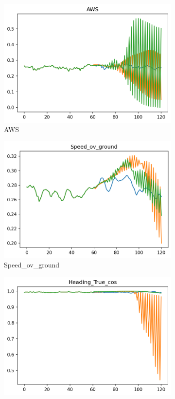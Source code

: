 \documentclass[12pt,twoside]{report}
\begin{document}
\begin{figure}[h]
\begin{subfigure}[b]{0.32\textwidth}
         \includegraphics[width=\textwidth]{figures/prediction-plots-joint/AWS.png}
         \caption{AWS}
     \end{subfigure}
     \begin{subfigure}[b]{0.32\textwidth}
         \centering
         \includegraphics[width=\textwidth]{figures/prediction-plots-joint/Speed_ov_ground.png}
         \caption{Speed\_ov\_ground}
     \end{subfigure}
     \begin{subfigure}[b]{0.32\textwidth}
         \centering
         \includegraphics[width=\textwidth]{figures/prediction-plots-joint/Heading_True_cos.png}

\end{subfigure}
\end{figure}
\end{document}
